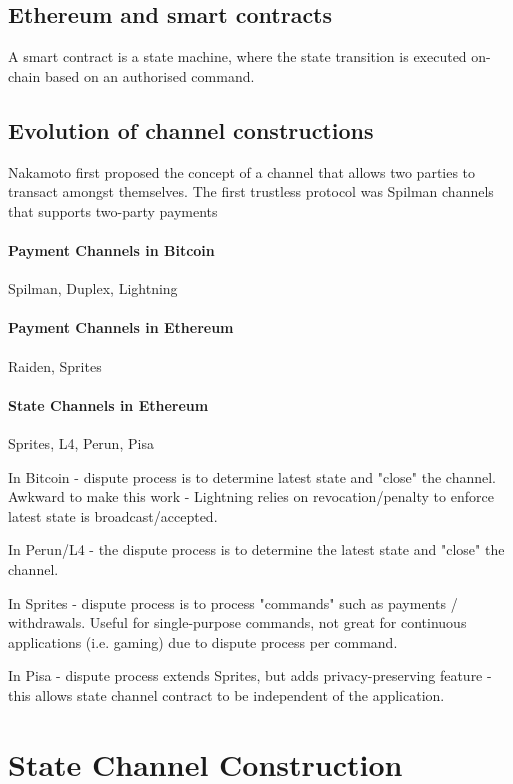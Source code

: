 \documentclass{llncs}
\begin{document}
\subsection{Ethereum and smart contracts}


A smart contract is a state machine, where the state transition is executed on-chain based on an authorised command. 


\subsection{Evolution of channel constructions}

Nakamoto first proposed the concept of a channel that allows two parties to transact amongst themselves. The first trustless protocol was Spilman channels that supports two-party payments 

\paragraph{Payment Channels in Bitcoin} 
Spilman, Duplex, Lightning

\paragraph{Payment Channels in Ethereum}
Raiden, Sprites

\paragraph{State Channels in Ethereum} 
Sprites, L4, Perun, Pisa

In Bitcoin - dispute process is to determine latest state and "close" the channel. Awkward to make this work - Lightning relies on revocation/penalty to enforce latest state is broadcast/accepted. 

In Perun/L4 - the dispute process is to determine the latest state and "close" the channel. 

In Sprites - dispute process is to process "commands" such as payments / withdrawals. Useful for single-purpose commands, not great for continuous applications (i.e. gaming) due to dispute process per command.

In Pisa - dispute process extends Sprites, but adds privacy-preserving feature - this allows state channel contract to be independent of the application. 

\section{State Channel Construction} 
\end{document}
